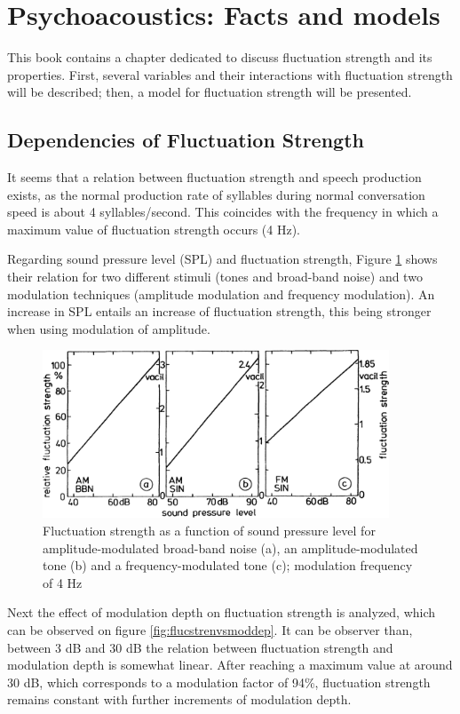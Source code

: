 \section{Psychoacoustics: Facts and models}

This book contains a chapter dedicated to discuss fluctuation strength and its
properties. First, several variables and their interactions with fluctuation
strength will be described; then, a model for fluctuation strength will be
presented.

\subsection{Dependencies of Fluctuation Strength}

It seems that a relation between fluctuation strength and speech production
exists, as the normal production rate of syllables during normal conversation
speed is about 4 syllables/second. This coincides with the frequency in which a
maximum value of fluctuation strength occurs (4 Hz).

Regarding sound pressure level (SPL) and fluctuation strength, Figure
\ref{fig:flucstrenvsndpreslvl} shows their relation for two different stimuli
(tones and broad-band noise) and two modulation techniques (amplitude modulation
and frequency modulation). An increase in SPL entails an increase of fluctuation
strength, this being stronger when using modulation of amplitude.

\begin{figure}
    \centering
    \includegraphics[height=5cm]
        {img/FluctuationStrengthVsSoundPressureLevel}
    \caption{Fluctuation strength as a function of sound pressure level for
        amplitude-modulated broad-band noise (a), an amplitude-modulated tone
        (b) and a frequency-modulated tone (c); modulation frequency of 4 Hz
        \cite[pp. 249]{Fastl2007Psychoacoustics}}
    \label{fig:flucstrenvsndpreslvl}
\end{figure}

Next the effect of modulation depth on fluctuation strength is analyzed, which
can be observed on figure \ref{fig:flucstrenvsmoddep}. It can be observer than,
between 3 dB and 30 dB the relation between fluctuation strength and modulation
depth is somewhat linear. After reaching a maximum value at around 30 dB, which
corresponds to a modulation factor of 94\%, fluctuation strength remains
constant with further increments of modulation depth.


